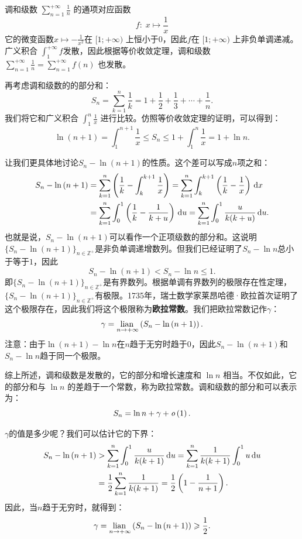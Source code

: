 \documentclass[12pt,UTF8]{ctexbook}
\begin{document}
\begin{so}
    调和级数 $\displaystyle\sum_{n=1}^{+\infty} \frac{1}{n}$ 的通项对应函数 
    $$f:\; x\mapsto \frac{1}{x}$$
    它的微变函数$x\mapsto -\frac{1}{x^2}$在 $[1;+\infty)$ 上恒小于$0$，因此$f$在 $[1;+\infty)$ 上非负单调递减。广义积合 $\int_1^{+\infty} f$发散，因此根据等价收敛定理，调和级数 $\displaystyle\sum_{n=1}^{+\infty} \frac{1}{n} = \sum_{n=1}^{+\infty} f(n)$ 也发散。
    
    再考虑调和级数的的部分和：
    \[
    S_n = \sum_{k=1}^{n} \frac{1}{k} = 1 + \frac{1}{2} + \frac{1}{3} + \cdots + \frac{1}{n}.
    \]
    我们将它和广义积合 $\int_1^{n} \frac{1}{x}$ 进行比较。仿照等价收敛定理的证明，可以得到：
    \[
    \ln{(n+1)} = \int_1^{n+1} \frac{1}{x} \leqslant S_n \leqslant 1 + \int_1^{n} \frac{1}{x} = 1 + \ln{n}.
    \]

    让我们更具体地讨论$S_n - \ln{(n+1)}$的性质。这个差可以写成$n$项之和：
    \begin{align*}       
        S_n - \ln{(n+1)} &= \sum_{k=1}^{n} \left(\frac{1}{k} - \int_k^{k+1} \frac{1}{x} \right) = \sum_{k=1}^{n} \int_k^{k+1} \left( \frac{1}{k} - \frac{1}{x} \right)\,\mathrm{d}x \\
        &= \sum_{k=1}^{n} \int_0^{1} \left( \frac{1}{k} - \frac{1}{k + u} \right)\,\mathrm{d}u = \sum_{k=1}^{n} \int_0^{1} \frac{u}{k(k + u)}\,\mathrm{d}u. 
    \end{align*}
    也就是说，$S_n - \ln{(n+1)}$可以看作一个正项级数的部分和。这说明$\{S_n - \ln{(n+1)}\}_{n\in\mathbb{Z}^+}$是非负单调递增数列。但我们已经证明了$S_n - \ln{n}$总小于等于$1$，因此
    $$S_n - \ln{(n+1)} < S_n - \ln{n} \leqslant 1.$$
    即$\{S_n - \ln{(n+1)}\}_{n\in\mathbb{Z}^+}$是有界数列。根据单调有界数列的极限存在性定理，$\{S_n - \ln{(n+1)}\}_{n\in\mathbb{Z}^+}$有极限。1735年，瑞士数学家莱昂哈德·欧拉首次证明了这个极限存在，因此我们将这个极限称为\textbf{欧拉常数}。我们把欧拉常数记作$\gamma$：
    $$\gamma = \underset{n\to+\infty}{\operatorname{lian}\,} \left( S_n - \ln{(n+1)} \right) .$$
    注意：由于$\ln{(n+1)} - \ln{n}$在$n$趋于无穷时趋于$0$，因此$S_n - \ln{(n+1)}$和$S_n - \ln{n}$趋于同一个极限。

    综上所述，调和级数是发散的，它的部分和增长速度和 $\ln{n}$ 相当。不仅如此，它的部分和与 $\ln{n}$ 的差趋于一个常数，称为欧拉常数。调和级数的部分和可以表示为：
    $$ S_n = \ln{n} + \gamma + \mathit{o}\left(1\right). $$

    $\gamma$的值是多少呢？我们可以估计它的下界：
    \begin{align*}       
        S_n - \ln{(n+1)} &> \sum_{k=1}^{n} \int_0^{1} \frac{u}{k(k + 1)}\,\mathrm{d}u = \sum_{k=1}^{n} \frac{1}{k(k + 1)} \int_0^{1} u\,\mathrm{d}u \\
        &= \frac{1}{2} \sum_{k=1}^{n} \frac{1}{k(k + 1)} = \frac{1}{2} \left( 1 - \frac{1}{n+1} \right).
    \end{align*}
    因此，当$n$趋于无穷时，就得到：
    $$ \gamma = \underset{n\to+\infty}{\operatorname{lian}\,} \left( S_n - \ln{(n+1)} \right) \geqslant \frac{1}{2}. $$
    

\end{so}
\end{document}
